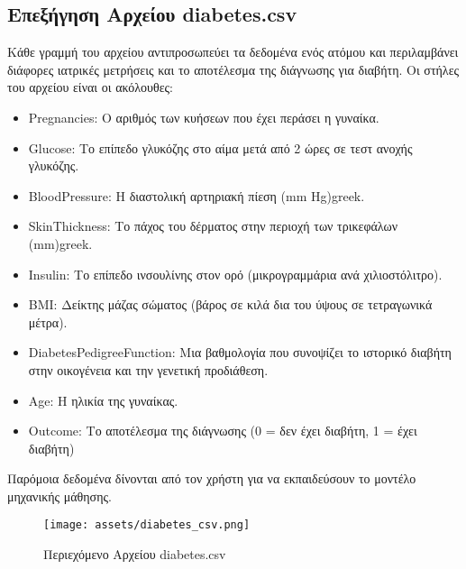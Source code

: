 \documentclass[a4paper,12pt]{article}
\begin{document}
\subsection{Επεξήγηση Αρχείου diabetes.csv}
Κάθε γραμμή του αρχείου αντιπροσωπεύει τα δεδομένα ενός ατόμου και περιλαμβάνει διάφορες ιατρικές μετρήσεις και το αποτέλεσμα της διάγνωσης για διαβήτη. 
Οι στήλες του αρχείου είναι οι ακόλουθες:
\begin{itemize}
    \item {}Pregnancies: Ο αριθμός των κυήσεων που έχει περάσει η γυναίκα.
    \item {}Glucose: Το επίπεδο γλυκόζης στο αίμα μετά από 2 ώρες σε τεστ ανοχής γλυκόζης.
    \item {}BloodPressure: Η διαστολική αρτηριακή πίεση (mm Hg){greek}.
    \item {}SkinThickness: Το πάχος του δέρματος στην περιοχή των τρικεφάλων (mm){greek}.
    \item {}Insulin: Το επίπεδο ινσουλίνης στον ορό (μικρογραμμάρια ανά χιλιοστόλιτρο).
    \item {}BMI: Δείκτης μάζας σώματος (βάρος σε κιλά δια του ύψους σε τετραγωνικά μέτρα).
    \item {}DiabetesPedigreeFunction: Μια βαθμολογία που συνοψίζει το ιστορικό διαβήτη στην οικογένεια και την γενετική προδιάθεση.
    \item {}Age: Η ηλικία της γυναίκας.
    \item {}Outcome: Το αποτέλεσμα της διάγνωσης (0 = δεν έχει διαβήτη, 1 = έχει διαβήτη)
\end{itemize}


\newpage

Παρόμοια δεδομένα δίνονται από τον χρήστη για να εκπαιδεύσουν το μοντέλο μηχανικής μάθησης.

\begin{figure}[h!]
  \centering
  \texttt{[image: assets/diabetes\_csv.png]}
  \caption{Περιεχόμενο Αρχείου  diabetes.csv}
  \label{fig:diabetes.csv}
\end{figure}
\end{document}
